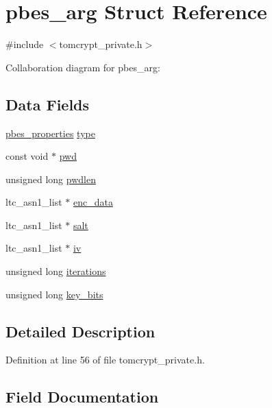 \hypertarget{structpbes__arg}{}\section{pbes\+\_\+arg Struct Reference}
\label{structpbes__arg}


{\ttfamily \#include $<$tomcrypt\+\_\+private.\+h$>$}



Collaboration diagram for pbes\+\_\+arg\+:
\subsection*{Data Fields}
\begin{DoxyCompactItemize}
\item 
\mbox{\hyperlink{structpbes__properties}{pbes\+\_\+properties}} \mbox{\hyperlink{structpbes__arg_a6879b93a34abc3b85c42fea0b0e92156}{type}}
\item 
const void $\ast$ \mbox{\hyperlink{structpbes__arg_a146b6c8875be0a3ac9f426327e83186a}{pwd}}
\item 
unsigned long \mbox{\hyperlink{structpbes__arg_a6f7f1324f1acfd51dcc7c1e334db7e0a}{pwdlen}}
\item 
ltc\+\_\+asn1\+\_\+list $\ast$ \mbox{\hyperlink{structpbes__arg_a8e69f095d7a7e8f5fad6fa49ea2d0d00}{enc\+\_\+data}}
\item 
ltc\+\_\+asn1\+\_\+list $\ast$ \mbox{\hyperlink{structpbes__arg_a356304efb7c4b45d06779905fd254797}{salt}}
\item 
ltc\+\_\+asn1\+\_\+list $\ast$ \mbox{\hyperlink{structpbes__arg_aeecdb7fb21b9beacfa5adf1f715eb9fd}{iv}}
\item 
unsigned long \mbox{\hyperlink{structpbes__arg_a78b52a8d8572e6947ebe909b51490ec6}{iterations}}
\item 
unsigned long \mbox{\hyperlink{structpbes__arg_ac59e419107215d6c89e2d9789a0c49f4}{key\+\_\+bits}}
\end{DoxyCompactItemize}


\subsection{Detailed Description}


Definition at line 56 of file tomcrypt\+\_\+private.\+h.



\subsection{Field Documentation}
\mbox{\label{structpbes__arg_a8e69f095d7a7e8f5fad6fa49ea2d0d00}} 
